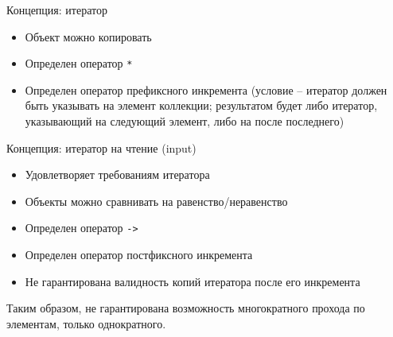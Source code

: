\documentclass[unknownkeysallowed,xcolor=table]{beamer}
\begin{document}
\begin{frame}[fragile]{Концепция: итератор}

\begin{itemize}
  \item Объект можно копировать \vspace{1em}
  \item Определен оператор \lstinline{*} \vspace{1em}
  \item Определен оператор префиксного инкремента (условие -- итератор должен быть указывать на элемент коллекции; результатом будет либо итератор, указывающий на следующий элемент, либо на после последнего)
\end{itemize}

\end{frame}

\begin{frame}[fragile]{Концепция: итератор на чтение (input)}

\begin{itemize}
  \item Удовлетворяет требованиям итератора \vspace{0.7em}
  \item Объекты можно сравнивать на равенство/неравенство \vspace{0.7em}
  \item Определен оператор \lstinline{->} \vspace{0.7em}
  \item Определен оператор постфиксного инкремента \vspace{0.7em}
  \item Не гарантирована валидность копий итератора после его инкремента
\end{itemize}

\vspace{1em}

Таким образом, не гарантирована возможность многократного прохода по элементам, только однократного.

\end{frame}
\end{document}
